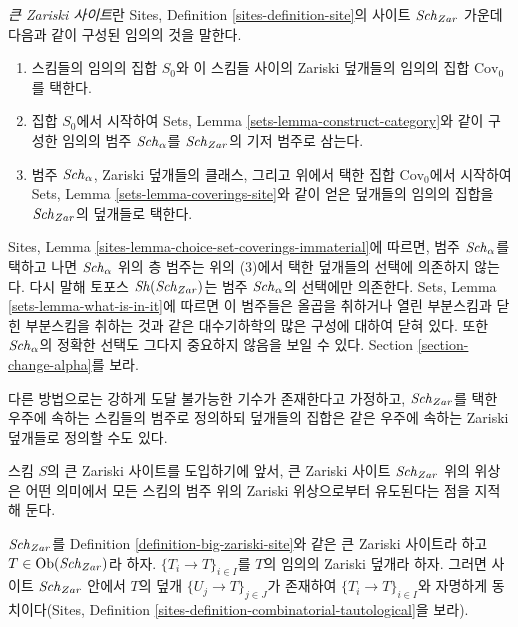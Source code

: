 \begin{definition}
\label{definition-big-zariski-site}
{\it 큰 Zariski 사이트}란 Sites, Definition
\ref{sites-definition-site}의 사이트 $\mathit{Sch}_{Zar}$ 가운데 다음과 같이
구성된 임의의 것을 말한다.
\begin{enumerate}
\item 스킴들의 임의의 집합 $S_0$와 이 스킴들 사이의 Zariski 덮개들의
임의의 집합 $\text{Cov}_0$를 택한다.
\item 집합 $S_0$에서 시작하여 Sets, Lemma
\ref{sets-lemma-construct-category}와 같이 구성한 임의의 범주
$\mathit{Sch}_\alpha$를 $\mathit{Sch}_{Zar}$의 기저 범주로 삼는다.
\item 범주 $\mathit{Sch}_\alpha$, Zariski 덮개들의 클래스, 그리고 위에서 택한
집합 $\text{Cov}_0$에서 시작하여 Sets, Lemma
\ref{sets-lemma-coverings-site}와 같이 얻은 덮개들의 임의의 집합을
$\mathit{Sch}_{Zar}$의 덮개들로 택한다.
\end{enumerate}
\end{definition}

\noindent
Sites, Lemma \ref{sites-lemma-choice-set-coverings-immaterial}에 따르면,
범주 $\mathit{Sch}_\alpha$를 택하고 나면 $\mathit{Sch}_\alpha$ 위의 층 범주는 위의
(3)에서 택한 덮개들의 선택에 의존하지 않는다. 다시 말해 토포스
$\mathop{\mathit{Sh}}\nolimits(\mathit{Sch}_{Zar})$는 범주 $\mathit{Sch}_\alpha$의 선택에만 의존한다. Sets,
Lemma \ref{sets-lemma-what-is-in-it}에 따르면 이 범주들은 올곱을 취하거나
열린 부분스킴과 닫힌 부분스킴을 취하는 것과 같은 대수기하학의 많은
구성에 대하여 닫혀 있다. 또한 $\mathit{Sch}_\alpha$의 정확한 선택도 그다지
중요하지 않음을 보일 수 있다. Section \ref{section-change-alpha}를 보라.

\medskip\noindent
다른 방법으로는 강하게 도달 불가능한 기수가 존재한다고 가정하고,
$\mathit{Sch}_{Zar}$를 택한 우주에 속하는 스킴들의 범주로 정의하되 덮개들의
집합은 같은 우주에 속하는 Zariski 덮개들로 정의할 수도 있다.

\medskip\noindent
스킴 $S$의 큰 Zariski 사이트를 도입하기에 앞서, 큰 Zariski 사이트
$\mathit{Sch}_{Zar}$ 위의 위상은 어떤 의미에서 모든 스킴의 범주 위의 Zariski
위상으로부터 유도된다는 점을 지적해 둔다.

\begin{lemma}
\label{lemma-zariski-induced}
$\mathit{Sch}_{Zar}$를 Definition \ref{definition-big-zariski-site}와 같은 큰
Zariski 사이트라 하고 $T \in \mathop{\mathrm{Ob}}\nolimits(\mathit{Sch}_{Zar})$라 하자.
$\{T_i \to T\}_{i \in I}$를 $T$의 임의의 Zariski 덮개라 하자. 그러면
사이트 $\mathit{Sch}_{Zar}$ 안에서 $T$의 덮개 $\{U_j \to T\}_{j \in J}$가
존재하여 $\{T_i \to T\}_{i \in I}$와 자명하게 동치이다(Sites,
Definition \ref{sites-definition-combinatorial-tautological}을 보라).
\end{lemma}

